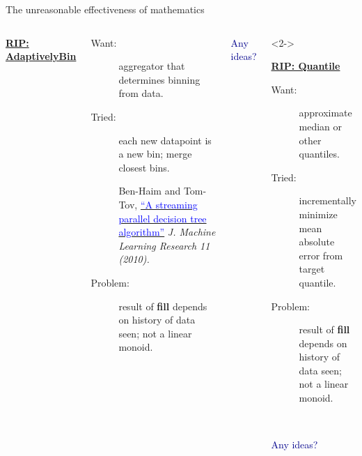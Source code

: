 \documentclass[aspectratio=169]{beamer}
\begin{document}
\begin{frame}{The unreasonable effectiveness of mathematics}
\large
\begin{columns}
\begin{center}
\bf \underline{RIP: AdaptivelyBin}
\end{center}

\begin{description}
\item[Want:] aggregator that determines binning from data.

\item[Tried:] each new datapoint is a new bin; merge closest bins.

\vspace{0.25 cm}
\begin{minipage}{\linewidth}
\scriptsize Ben-Haim and Tom-Tov, \href{http://www.jmlr.org/papers/volume11/ben-haim10a/ben-haim10a.pdf}{\textcolor{blue}{``A streaming parallel decision tree algorithm''}} {\it J. Machine Learning Research 11 (2010).}
\end{minipage}

\item[Problem:] result of {\ttfamily\small\textbf{fill}} depends on history of data seen; not a linear monoid.
\end{description}

\begin{center}
\textcolor{darkblue}{Any ideas?}
\end{center}

\begin{uncoverenv}<2->
\begin{center}
\bf \underline{RIP: Quantile}
\end{center}

\begin{description}
\item[Want:] approximate median or other quantiles.

\item[Tried:] incrementally minimize mean absolute error from target quantile.

\item[Problem:] result of {\ttfamily\small\textbf{fill}} depends on history of data seen; not a linear monoid.

\mbox{ }
\end{description}

\begin{center}
\textcolor{darkblue}{Any ideas?}
\end{center}
\end{uncoverenv}
\end{columns}
\end{frame}
\end{document}
